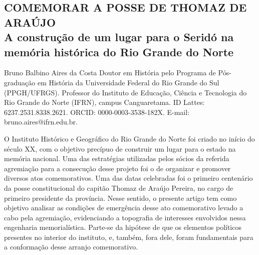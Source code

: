 \begin{refsection}
    \renewcommand{\thefigure}{\arabic{figure}}

    \chapter[Comemorar a posse de Thomaz de Araújo: {\itshape a construção de um lugar para o Seridó na memória histórica do RN}]{\uppercase{Comemorar a posse de Thomaz de Araújo}\\A construção de um lugar para o Seridó na memória histórica do Rio Grande do Norte}
    \label{chap:comemorar}
    
    \articleAuthor
    {Bruno Balbino Aires da Costa}
    {Doutor em História pelo Programa de Pós-graduação em História da Universidade Federal do Rio Grande do Sul (PPGH/UFRGS). Professor do Instituto de Educação, Ciência e Tecnologia do Rio Grande do Norte (IFRN), campus Canguaretama. ID Lattes: 6237.2531.8338.2621. ORCID: 0000-0003-3538-182X. E-mail: bruno.aires@ifrn.edu.br.}

    \begin{galoResumo}
        O Instituto Histórico e Geográfico do Rio Grande do Norte foi criado no início do século XX, com o objetivo precípuo de construir um lugar para o estado na memória nacional. Uma das estratégias utilizadas pelos sócios da referida agremiação para a consecução desse projeto foi o de organizar e promover diversos atos comemorativos. Uma das datas celebradas foi o primeiro centenário da posse constitucional do capitão Thomaz de Araújo Pereira, no cargo de primeiro presidente da província. Nesse sentido, o presente artigo tem como objetivo analisar as condições de emergência desse ato comemorativo levado a cabo pela agremiação, evidenciando a topografia de interesses envolvidos nessa engenharia memorialística. Parte-se da hipótese de que os elementos políticos presentes no interior do instituto, e, também, fora dele, foram fundamentais para a conformação desse arranjo comemorativo.
    \end{galoResumo}
    
    

\end{refsection}
